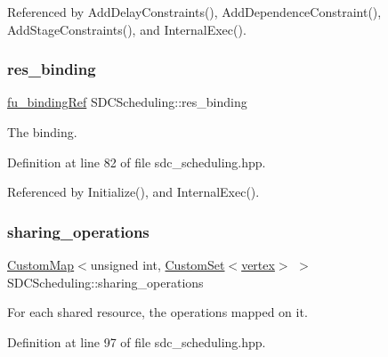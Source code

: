 Referenced by Add\+Delay\+Constraints(), Add\+Dependence\+Constraint(), Add\+Stage\+Constraints(), and Internal\+Exec().

\mbox{\label{classSDCScheduling_af2ac518cfdb99a49305bf28c878af96f}} 
\subsubsection{\texorpdfstring{res\+\_\+binding}{res\_binding}}
{\footnotesize\ttfamily \hyperlink{fu__binding_8hpp_a619181df8ab98d7b7e17de58ac44b065}{fu\+\_\+binding\+Ref} S\+D\+C\+Scheduling\+::res\+\_\+binding\hspace{0.3cm}{\ttfamily [protected]}}



The binding. 



Definition at line 82 of file sdc\+\_\+scheduling.\+hpp.



Referenced by Initialize(), and Internal\+Exec().

\mbox{\label{classSDCScheduling_a0a0a1d02753e664c45b75f2473a14e79}} 
\subsubsection{\texorpdfstring{sharing\+\_\+operations}{sharing\_operations}}
{\footnotesize\ttfamily \hyperlink{custom__map_8hpp_a18ca01763abbe3e5623223bfe5aaac6b}{Custom\+Map}$<$unsigned int, \hyperlink{custom__set_8hpp_a615bc2f42fc38a4bb1790d12c759e86f}{Custom\+Set}$<$\hyperlink{graph_8hpp_abefdcf0544e601805af44eca032cca14}{vertex}$>$ $>$ S\+D\+C\+Scheduling\+::sharing\+\_\+operations\hspace{0.3cm}{\ttfamily [protected]}}



For each shared resource, the operations mapped on it. 



Definition at line 97 of file sdc\+\_\+scheduling.\+hpp.



